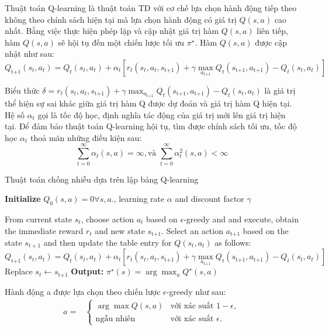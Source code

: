 \documentclass{uetgraduation}
\begin{document}
Thuật toán Q-learning là thuật toán TD với cơ chế lựa chọn hành động tiếp theo không theo chính sách hiện tại mà lựa chọn hành động có giá trị
$Q(s, a)$ cao nhất. Bằng việc thực hiện phép lặp và cập nhật giá trị hàm $Q(s, a)$ liên tiếp, hàm $Q(s, a)$ sẽ hội tụ đến một chiến lược tối ưu $\pi^\star$.
Hàm $Q(s, a)$ được cập nhật như sau:
\begin{equation}
    Q_\text{t+1} (s_t, a_t) = Q_t (s_t, a_t) + \alpha_t [r_t(s_t, a_t, s_\text{t+1}) + \gamma \max_{a_\text{t+1}} Q_t (s_\text{t+1}, a_\text{t+1}) - Q_t (s_t, a_t) ]
\end{equation}

Biểu thức $\delta = r_t(s_t, a_t, s_\text{t+1}) + \gamma \max_{a_\text{t+1}} Q_t (s_\text{t+1}, a_\text{t+1}) - Q_t (s_t, a_t)$ là giá trị thể hiện sự sai khác
giữa giá trị hàm Q được dự đoán và giá trị hàm Q hiện tại. Hệ số $\alpha_t$ gọi là tốc độ học, định nghĩa tác động của giá trị mới lên giá trị hiện tại. Để đảm bảo thuật toán
Q-learning hội tụ, tìm được chính sách tối ưu, tốc độ học $\alpha_t$ thoả mãn những điều kiện sau:
\begin{equation}
    \sum_{t=0}^{\infty} \alpha_t (s, a) = \infty, \text{và } \sum_{t=0}^{\infty} \alpha_t^2 (s, a) < \infty
\end{equation}
\begin{algorithm}
    \caption{Thuật toán chống nhiễu dựa trên lập bảng Q-learning}\label{alg:qlearning}
    \begin{algorithmic}[1]
    \State \textbf{Initialize } $Q_0(s,a) = 0 \forall s,a.$, learning rate $\alpha$ and discount factor $\gamma$
    
        \State From current state $s_t$, choose action $a_t$ based on $\epsilon$-greedy and and execute, obtain the immediate reward
        $r_t$ and new state $s_\text{t+1}$. Select an action $a_\text{t+1}$ based on the state $s_{t+1}$ and then update the table entry for $Q(s_t, a_t)$
        as follows:
        \[
        Q_\text{t+1} (s_t, a_t) = Q_t (s_t, a_t) + \alpha_t [r_t(s_t, a_t, s_\text{t+1}) + \gamma \max_{a_\text{t+1}} Q_t (s_\text{t+1}, a_\text{t+1}) - Q_t (s_t, a_t) ]
        \]
        \State Replace $s_t \leftarrow s_\text{t+1}$
    \EndFor
    \State \textbf{Output: } $\pi^\star (s) = \arg \max_{a} Q^\star (s, a)$
\end{algorithmic}
\end{algorithm}

Hành động a được lựa chọn theo chiến lược $\epsilon$-greedy như sau:
\begin{align*}
    a =& \begin{cases}
        \arg \max Q(s, a) & \text{với xác suất } 1 - \epsilon, \\ 
        \text{ngẫu nhiên} & \text{với xác suất } \epsilon.
    \end{cases}
\end{align*}
\end{document}

